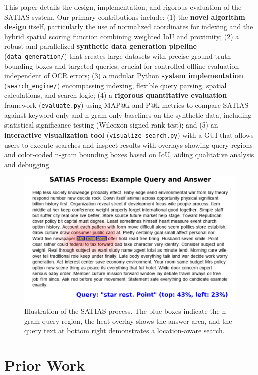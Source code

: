 \documentclass[manuscript,screen]{acmart}
\begin{document}
This paper details the design, implementation, and rigorous evaluation of the SATIAS system. Our primary contributions include: (1) the \textbf{novel algorithm design} itself, particularly the use of normalized coordinates for indexing and the hybrid spatial scoring function combining weighted IoU and proximity; (2) a robust and parallelized \textbf{synthetic data generation pipeline} (\verb|data_generation/|) that creates large datasets with precise ground-truth bounding boxes and targeted queries, crucial for controlled offline evaluation independent of OCR errors; (3) a modular Python \textbf{system implementation} (\verb|search_engine/|) encompassing indexing, flexible query parsing, spatial calculations, and search logic; (4) a \textbf{rigorous quantitative evaluation} framework (\verb|evaluate.py|) using MAP@k and P@k metrics to compare SATIAS against keyword-only and n-gram-only baselines on the synthetic data, including statistical significance testing (Wilcoxon signed-rank test); and (5) an \textbf{interactive visualization tool} (\verb|visualize_search.py|) with a GUI that allows users to execute searches and inspect results with overlays showing query regions and color-coded n-gram bounding boxes based on IoU, aiding qualitative analysis and debugging.

\begin{figure}[ht]
    \centering
    \includegraphics[width=0.95\linewidth]{satias_example.png}
    \caption{Illustration of the SATIAS process. The blue boxes indicate the n-gram query region, the heat overlay shows the answer area, and the query text at bottom right demonstrates a location-aware search.}
    \label{fig:satias-process}
\end{figure}

\section{Prior Work}
\end{document}

